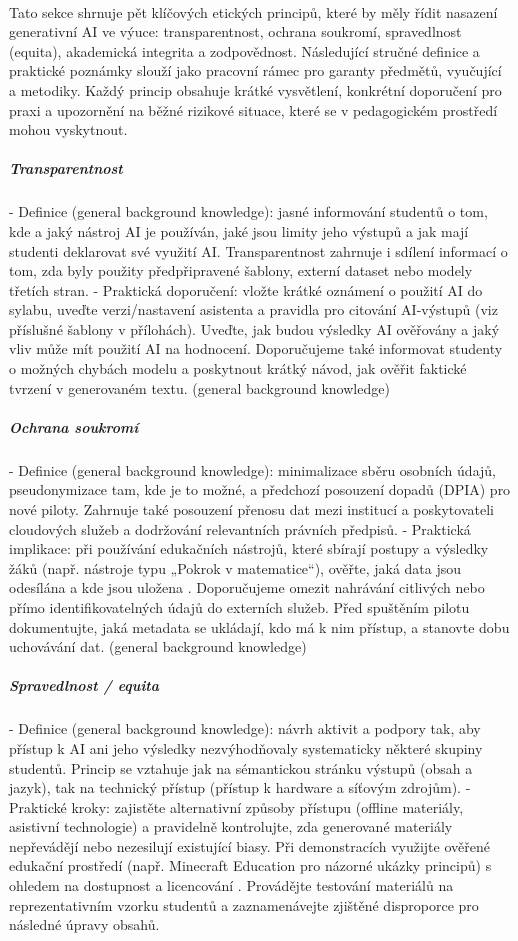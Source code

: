 \paragraph{}
Tato sekce shrnuje pět klíčových etických principů, které by měly řídit nasazení generativní AI ve výuce: transparentnost, ochrana soukromí, spravedlnost (equita), akademická integrita a zodpovědnost. Následující stručné definice a praktické poznámky slouží jako pracovní rámec pro garanty předmětů, vyučující a metodiky. Každý princip obsahuje krátké vysvětlení, konkrétní doporučení pro praxi a upozornění na běžné rizikové situace, které se v pedagogickém prostředí mohou vyskytnout.

\subparagraph{Transparentnost}
- Definice (general background knowledge): jasné informování studentů o tom, kde a jaký nástroj AI je používán, jaké jsou limity jeho výstupů a jak mají studenti deklarovat své využití AI. Transparentnost zahrnuje i sdílení informací o tom, zda byly použity předpřipravené šablony, externí dataset nebo modely třetích stran.
- Praktická doporučení: vložte krátké oznámení o použití AI do sylabu, uveďte verzi/nastavení asistenta a pravidla pro citování AI‑výstupů (viz příslušné šablony v přílohách). Uveďte, jak budou výsledky AI ověřovány a jaký vliv může mít použití AI na hodnocení. Doporučujeme také informovat studenty o možných chybách modelu a poskytnout krátký návod, jak ověřit faktické tvrzení v generovaném textu. (general background knowledge)

\subparagraph{Ochrana soukromí}
- Definice (general background knowledge): minimalizace sběru osobních údajů, pseudonymizace tam, kde je to možné, a předchozí posouzení dopadů (DPIA) pro nové piloty. Zahrnuje také posouzení přenosu dat mezi institucí a poskytovateli cloudových služeb a dodržování relevantních právních předpisů.
- Praktická implikace: při používání edukačních nástrojů, které sbírají postupy a výsledky žáků (např. nástroje typu „Pokrok v matematice“), ověřte, jaká data jsou odesílána a kde jsou uložena \cite{kb_ai_101_tipu_pdf_04e4a115_page_8_1}. Doporučujeme omezit nahrávání citlivých nebo přímo identifikovatelných údajů do externích služeb. Před spuštěním pilotu dokumentujte, jaká metadata se ukládají, kdo má k nim přístup, a stanovte dobu uchovávání dat. (general background knowledge)

\subparagraph{Spravedlnost / equita}
- Definice (general background knowledge): návrh aktivit a podpory tak, aby přístup k AI ani jeho výsledky nezvýhodňovaly systematicky některé skupiny studentů. Princip se vztahuje jak na sémantickou stránku výstupů (obsah a jazyk), tak na technický přístup (přístup k hardware a síťovým zdrojům).
- Praktické kroky: zajistěte alternativní způsoby přístupu (offline materiály, asistivní technologie) a pravidelně kontrolujte, zda generované materiály nepřevádějí nebo nezesilují existující biasy. Při demonstracích využijte ověřené edukační prostředí (např. Minecraft Education pro názorné ukázky principů) s ohledem na dostupnost a licencování \cite{kb_ai_101_tipu_pdf_04e4a115_page_15_2}. Provádějte testování materiálů na reprezentativním vzorku studentů a zaznamenávejte zjištěné disproporce pro následné úpravy obsahů.

